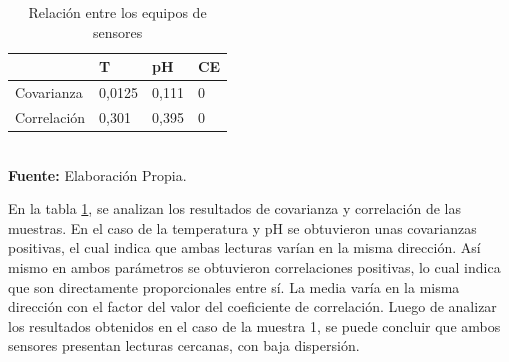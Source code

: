 \begin{table}[]
\caption{Relaci\'on entre los equipos de sensores}
\label{tab:VaCoM1}
\centering
\begin{tabular}{llll} 
\toprule
& T   &  pH    & CE \\
\midrule
Covarianza  & 0,0125& 0,111 & 0                \\
Correlación & 0,301& 0,395 & 0        \\
\bottomrule
\end{tabular}
\\ \textbf{Fuente: }Elaboración Propia.
\end{table}     
En la tabla \ref{tab:VaCoM1}, se analizan los resultados de covarianza y correlación de las muestras. 
En el caso de la temperatura y pH se obtuvieron unas covarianzas positivas, el cual indica que ambas lecturas varían en la misma dirección.
As\'i mismo en ambos par\'ametros se obtuvieron correlaciones positivas, lo cual indica que son directamente proporcionales entre sí. 
La media varía en la misma dirección con el factor del valor del coeficiente de correlación. 
Luego de analizar los resultados obtenidos en el caso de la muestra 1, se puede concluir que ambos sensores presentan lecturas cercanas, con baja dispersi\'on. 

